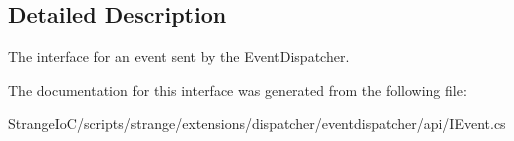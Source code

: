 \subsection{Detailed Description}
The interface for an event sent by the Event\-Dispatcher. 

The documentation for this interface was generated from the following file\-:\begin{DoxyCompactItemize}
\item 
Strange\-Io\-C/scripts/strange/extensions/dispatcher/eventdispatcher/api/I\-Event.\-cs\end{DoxyCompactItemize}
